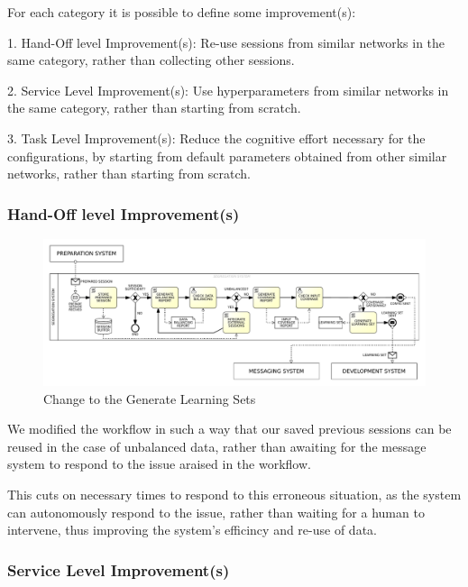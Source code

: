 For each category it is possible to define some improvement(s):

1. Hand-Off level Improvement(s): Re-use sessions from similar networks in the same category, rather than collecting other sessions.

2. Service Level Improvement(s): Use hyperparameters from similar networks in the same category, rather than starting from scratch.

3. Task Level Improvement(s): Reduce the cognitive effort necessary for the configurations, by starting from default parameters obtained from other similar networks, rather than starting from scratch.


\subsubsection{Hand-Off level Improvement(s)}
\label{subsec:hand_off_level_improvements}


\begin{figure}[H]
    \centering
    \includegraphics[width=1\textwidth]{figures/TO-BE Business Diagram - Generate Learning Sets.pdf}
    \caption{Change to the Generate Learning Sets}
    \label{fig:to_be_generate_learning_sets}
\end{figure}

We modified the workflow in such a way that our saved previous sessions can be reused in the case of unbalanced data, rather than awaiting for the message system to respond to the issue araised in the workflow.

This cuts on necessary times to respond to this erroneous situation, as the system can autonomously respond to the issue, rather than waiting for a human to intervene, thus improving the system's efficincy and re-use of data.



\subsubsection{Service Level Improvement(s)}
\label{subsec:service_level_improvements}

